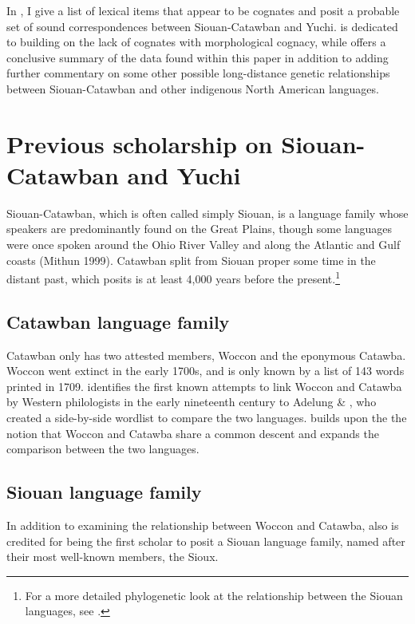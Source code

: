 \documentclass[output=paper]{LSP/langsci}
\begin{document}
In , I give a list of lexical items that appear to be cognates and posit a probable set of sound correspondences between Siouan-Catawban and Yuchi.  is dedicated to building on the lack of cognates with morphological cognacy, while  offers a conclusive summary of the data found within this paper in addition to adding further commentary on some other possible long-distance genetic relationships between Siouan-Catawban and other indigenous North American languages.

\section{Previous scholarship on Siouan-Catawban and Yuchi}

Siouan-Catawban, which is often called simply Siouan, is a language family whose speakers are predominantly found on the Great Plains, though some languages were once spoken around the Ohio River Valley and along the Atlantic and Gulf coasts (Mithun 1999). Catawban split from Siouan proper some time in the distant past, which \citet{Rankin1996} posits is at least 4,000 years before the present.\footnote{For a more detailed phylogenetic look at the relationship between the Siouan languages, see \citet{Rankin2010}.}

\subsection{Catawban language family}

Catawban only has two attested members, Woccon and the eponymous Catawba. Woccon went extinct in the early 1700s, and is only known by a list of 143 words printed in 1709. \citet{Carter1980} identifies the first known attempts to link Woccon and Catawba by Western philologists in the early nineteenth century to Adelung \& \citet{Vater1816}, who created a side-by-side wordlist to compare the two languages. \citet{Gallatin1836} builds upon the the notion that Woccon and Catawba share a common descent and expands the comparison between the two languages.

\subsection{Siouan language family}

In addition to examining the relationship between Woccon and Catawba, \citet{Gallatin1836} also is credited for being the first scholar to posit a Siouan language family, named after their most well-known members, the Sioux. 
\end{document}
